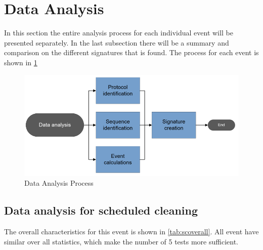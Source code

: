 \section{Data Analysis}
In this section the entire analysis process for each individual event will be presented separately. In the last subsection there will be a summary and comparison on the different signatures that is found. The process for each event is shown in \ref{fig:dataanalysisprocess}

\begin{figure}[H]
    \centering
    \includegraphics[width=\textwidth]{figures/data-analysis-process.png}
    \caption{Data Analysis Process}
    \label{fig:dataanalysisprocess}
\end{figure}

\subsection{Data analysis for scheduled cleaning}
The overall characteristics for this event is shown in \ref{tab:scoverall}. All event have similar over all statistics, which make the number of 5 tests more sufficient. 

